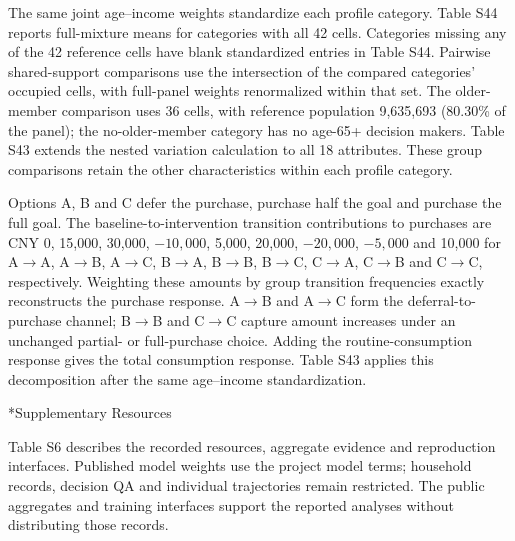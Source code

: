 \documentclass[10pt]{article}
\makeatletter
\renewcommand\section{\@startsection{section}{1}{\z@}{-2.2ex plus -1ex minus -.2ex}{.9ex plus .2ex}{\normalfont\large\mdseries}}
\makeatother
\begin{document}
The same joint age--income weights standardize each profile category. Table S44 reports full-mixture means for categories with all 42 cells. Categories missing any of the 42 reference cells have blank standardized entries in Table S44. Pairwise shared-support comparisons use the intersection of the compared categories' occupied cells, with full-panel weights renormalized within that set. The older-member comparison uses 36 cells, with reference population 9,635,693 (80.30\% of the panel); the no-older-member category has no age-65+ decision makers. Table S43 extends the nested variation calculation to all 18 attributes. These group comparisons retain the other characteristics within each profile category.

Options A, B and C defer the purchase, purchase half the goal and purchase the full goal. The baseline-to-intervention transition contributions to purchases are CNY 0, 15,000, 30,000, $-10,000$, 5,000, 20,000, $-20,000$, $-5,000$ and 10,000 for A$\to$A, A$\to$B, A$\to$C, B$\to$A, B$\to$B, B$\to$C, C$\to$A, C$\to$B and C$\to$C, respectively. Weighting these amounts by group transition frequencies exactly reconstructs the purchase response. A$\to$B and A$\to$C form the deferral-to-purchase channel; B$\to$B and C$\to$C capture amount increases under an unchanged partial- or full-purchase choice. Adding the routine-consumption response gives the total consumption response. Table S43 applies this decomposition after the same age--income standardization.

\section*{Supplementary Resources}

Table S6 describes the recorded resources, aggregate evidence and reproduction interfaces. Published model weights use the project model terms; household records, decision QA and individual trajectories remain restricted. The public aggregates and training interfaces support the reported analyses without distributing those records.
\end{document}
